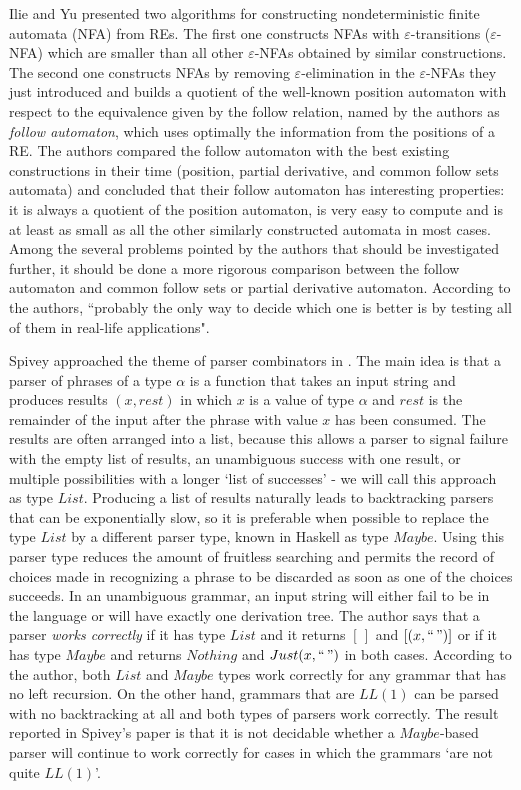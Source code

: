 \documentclass[oneside,12pt]{scrbook}
\theoremstyle{definition}
\theoremstyle{plain}
\theoremstyle{definition}
\begin{document}
Ilie and Yu \cite{Ilie2003} presented two algorithms for constructing nondeterministic finite automata (NFA) from REs. The first one constructs NFAs with $\varepsilon$-transitions ($\varepsilon$-NFA) which are smaller than all other $\varepsilon$-NFAs obtained by similar constructions. The second one constructs NFAs by removing $\varepsilon$-elimination in the $\varepsilon$-NFAs they just introduced and builds a quotient of the well-known position automaton with respect to the equivalence given by the follow relation, named by the authors as \textit{follow automaton}, which uses optimally the information from the positions of a RE. The authors compared the follow automaton with the best existing constructions in their time (position, partial derivative, and common follow sets automata) and concluded that their follow automaton has interesting properties: it is always a quotient of the position automaton, is very easy to compute and is at least as small as all the other similarly constructed automata in most cases. Among the several problems pointed by the authors that should be investigated further, it should be done a more rigorous comparison between the follow automaton and common follow sets or partial derivative automaton. According to the authors, ``probably the only way to decide which one is better is by testing all of them in real-life applications".


Spivey approached the theme of parser combinators in \cite{Spivey2012}. The main idea is that a parser of phrases of a type $\alpha$ is a function that takes an input string and produces results $(x,rest)$ in which $x$ is a value of type $\alpha$ and $rest$ is the remainder of the input after the phrase with value $x$ has been consumed. The results are often arranged into a list, because this allows a
parser to signal failure with the empty list of results, an unambiguous success with one result, or multiple possibilities with a longer ‘list of successes’ - we will call this approach as type $List$. Producing a list of results naturally leads to backtracking parsers that can be exponentially slow, so it is preferable when possible to replace the type $List$ by a different parser type, known in Haskell as type $Maybe$. Using this parser type reduces the amount of fruitless searching and permits the record of choices made in recognizing a phrase to be discarded as soon as one of the choices succeeds. In an unambiguous grammar, an input string will either fail to be in the language or will have exactly one derivation tree. The author says that a parser \textit{works correctly} if it has type $List$ and it returns $[\,]$ and $[(x, ``\,")]$ or if it has type $Maybe$ and returns $Nothing$ and $Just (x, ``\,")$ in both cases. According to the author, both $List$ and $Maybe$ types work correctly for any grammar that has no left recursion. On the other hand, grammars that are $LL(1)$ can be parsed with no backtracking at all and both types of parsers work correctly. The result reported in Spivey's paper is that it is not decidable whether a $Maybe$-based parser will continue to work correctly for cases in which the grammars `are not quite $LL(1)$'.
\end{document}
